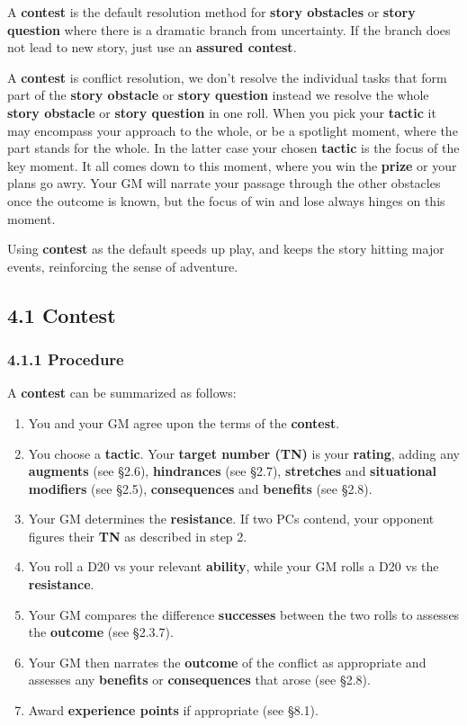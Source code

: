 \documentclass[
  11pt,
]{article}
\providecommand{\tightlist}{%
  \setlength{\itemsep}{0pt}\setlength{\parskip}{0pt}}
\begin{document}
A \textbf{contest} is the default resolution method for \textbf{story
obstacles} or \textbf{story question} where there is a dramatic branch
from uncertainty. If the branch does not lead to new story, just use an
\textbf{assured contest}.

A \textbf{contest} is conflict resolution, we don't resolve the
individual tasks that form part of the \textbf{story obstacle} or
\textbf{story question} instead we resolve the whole \textbf{story
obstacle} or \textbf{story question} in one roll. When you pick your
\textbf{tactic} it may encompass your approach to the whole, or be a
spotlight moment, where the part stands for the whole. In the latter
case your chosen \textbf{tactic} is the focus of the key moment. It all
comes down to this moment, where you win the \textbf{prize} or your
plans go awry. Your GM will narrate your passage through the other
obstacles once the outcome is known, but the focus of win and lose
always hinges on this moment.

Using \textbf{contest} as the default speeds up play, and keeps the
story hitting major events, reinforcing the sense of adventure.

\hypertarget{contest-1}{%
\subsection{4.1 Contest}\label{contest-1}}

\hypertarget{procedure}{%
\subsubsection{4.1.1 Procedure}\label{procedure}}

A \textbf{contest} can be summarized as follows:

\begin{enumerate}
\def\labelenumi{\arabic{enumi}.}
\tightlist
\item
  You and your GM agree upon the terms of the \textbf{contest}.
\item
  You choose a \textbf{tactic}. Your \textbf{target number (TN)} is your
  \textbf{rating}, adding any \textbf{augments} (see §2.6),
  \textbf{hindrances} (see §2.7), \textbf{stretches} and
  \textbf{situational modifiers} (see §2.5), \textbf{consequences} and
  \textbf{benefits} (see §2.8).
\item
  Your GM determines the \textbf{resistance}. If two PCs contend, your
  opponent figures their \textbf{TN} as described in step 2.
\item
  You roll a D20 vs your relevant \textbf{ability}, while your GM rolls
  a D20 vs the \textbf{resistance}.
\item
  Your GM compares the difference \textbf{successes} between the two
  rolls to assesses the \textbf{outcome} (see §2.3.7).
\item
  Your GM then narrates the \textbf{outcome} of the conflict as
  appropriate and assesses any \textbf{benefits} or
  \textbf{consequences} that arose (see §2.8).
\item
  Award \textbf{experience points} if appropriate (see §8.1).
\end{enumerate}
\end{document}
